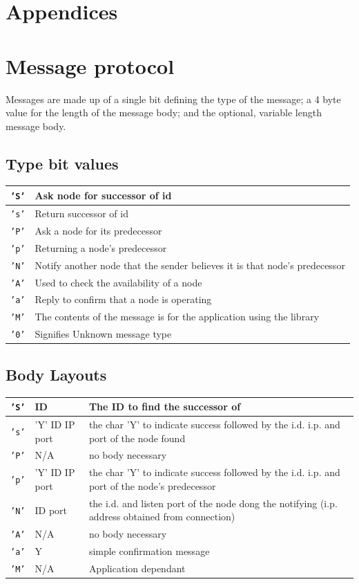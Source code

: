 \documentclass{article}
\begin{document}
\section{Appendices}
\appendix
\section{Message protocol}

Messages are made up of a single bit defining the type of the message; a 4 byte value for the length of the message body; and the optional, variable length message body.

\subsection{Type bit values}
\begin{tabular}{|l | l|}
\hline
\texttt{'S'} & Ask node for successor of id \\\hline
\texttt{'s'} & Return successor of id \\\hline
\texttt{'P'} & Ask a node for its predecessor \\\hline
\texttt{'p'} & Returning a node's predecessor \\\hline
\texttt{'N'} & Notify another node that the sender believes it is that node's predecessor \\\hline
\texttt{'A'} & Used to check the availability of a node\\\hline
\texttt{'a'} & Reply to confirm that a node is operating \\\hline
\texttt{'M'} & The contents of the message is for the application using the library \\\hline
\texttt{'0'} & Signifies Unknown message type \\\hline
\end{tabular}

\subsection{Body Layouts}
\begin{tabular}{|l | l | L|}
\hline
\texttt{'S'} & ID & The ID to find the successor of\\\hline
\texttt{'s'} & 'Y' ID IP port & the char 'Y' to indicate success followed by the i.d. i.p. and port of the node found\\\hline
\texttt{'P'} & N/A & no body necessary\\\hline
\texttt{'p'} & 'Y' ID IP port & the char 'Y' to indicate success followed by the i.d. i.p. and port of the node's predecessor \\\hline
\texttt{'N'} & ID port & the i.d. and listen port of the node dong the notifying (i.p. address obtained from connection) \\\hline
\texttt{'A'} & N/A & no body necessary\\\hline
\texttt{'a'} & Y & simple confirmation message\\\hline
\texttt{'M'} & N/A & Application dependant\\\hline
\end{tabular}
\end{document}
